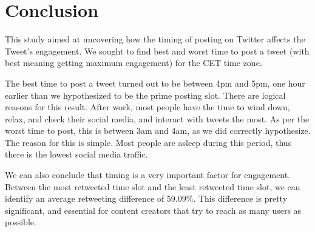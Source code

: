 \documentclass[11pt]{article}
\begin{document}
\section{Conclusion}
This study aimed at uncovering how the timing of posting on Twitter affects the Tweet's engagement. We sought to find best and worst time to post a tweet (with best meaning getting maximum engagement) for the CET time zone.

The best time to post a tweet turned out to be between 4pm and 5pm, one hour earlier than we hypothesized to be the prime posting slot. There are logical reasons for this result. After work, most people have the time to wind down, relax, and check their social media, and interact with tweets the most. As per the worst time to post, this is between 3am and 4am, as we did correctly hypothesize. The reason for this is simple. Most people are asleep during this period, thus there is the lowest social media traffic.

We can also conclude that timing is a very important factor for engagement. Between the most retweeted time slot and the least retweeted time slot, we can identify an average retweeting difference of 59.09\%. This difference is pretty significant, and essential for content creators that try to reach as many users as possible.







\end{document}
